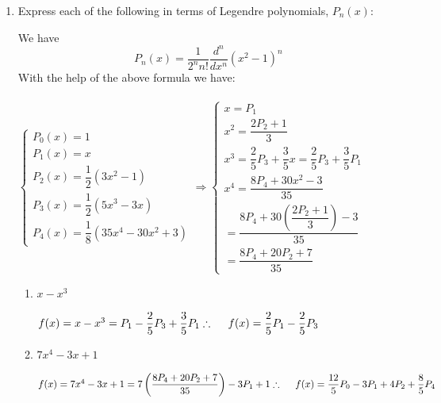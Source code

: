 \documentclass[fleqn]{article}
\begin{document}
\begin{enumerate}
    
    \item Express each of the following in terms of Legendre polynomials, $
    P_{n}\left( x\right) $:

      \textcolor{hwColor}{
        We have $$P_n(x)=\dfrac{1}{2^n n!} \dfrac{d^n}{dx^n} (x^2-1)^n$$
        With the help of the above formula we have: \\
        \\
        $
          \begin{cases}
            P_0(x)=1
            \\
            P_1(x)=x
            \\
            P_2(x)=\dfrac{1}{2} (3x^2-1)
            \\
            P_3(x)=\dfrac{1}{2} (5x^3-3x)
            \\
            P_4(x)=\dfrac{1}{8} (35x^4-30x^2+3)
          \end{cases} \Longrightarrow \begin{cases}
            x=P_1
            \\
            x^2=\dfrac{2P_2+1}{3}
            \\
            x^3=\dfrac{2}{5} P_3+\dfrac{3}{5}x=\dfrac{2}{5} P_3+\dfrac{3}{5}P_1
            \\
            x^4=\dfrac{8P_4+30x^2-3}{35} 
            \\
            =\dfrac{8P_4+30\left(\dfrac{2P_2+1}{3}\right)-3}{35}
            \\
            =\dfrac{8P_4+20P_2+7}{35} 
          \end{cases}
        $
      }
      
      \begin{enumerate}
        \item $x-x^{3}$
        
          \textcolor{hwColor}{
            $
              f(x)=x-x^3=P_1-\dfrac{2}{5} P_3+\dfrac{3}{5}P_1
              \\
              \\
              \therefore ~~~~ f(x)=\dfrac{2}{5} P_1-\dfrac{2}{5}P_3
            $ 
          }
        
        \item $7x^{4}-3x+1$
        
          \textcolor{hwColor}{
            $
              f(x)=7x^{4}-3x+1=7\left(\dfrac{8P_4+20P_2+7}{35}\right)-3P_1+1
              \\
              \\
              \therefore ~~~~ f(x)=\dfrac{12}{5}P_0-3P_1+4P_2+\dfrac{8}{5}P_4
            $
          }


\end{enumerate}
\end{enumerate}
\end{document}
